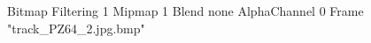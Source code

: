 {Bitmap
	{Filtering 1}
	{Mipmap 1}
	{Blend none}
	{AlphaChannel 0}
	{Frame "track_PZ64_2.jpg.bmp"}
}

